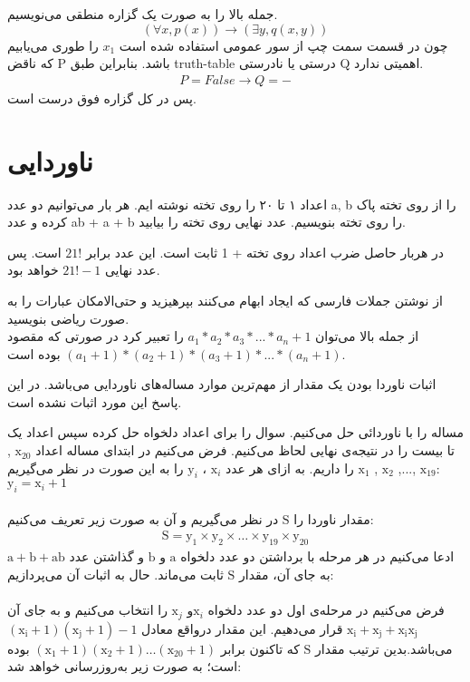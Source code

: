 \documentclass[11pt,largemargins]{h2wp}
\begin{document}
 جمله بالا را به صورت یک گزاره منطقی می‌نویسیم.
  $$  (\forall x,p(x)) \rightarrow (\exists y, q(x,y)) $$
چون در قسمت سمت چپ از سور عمومی استفاده شده است 
$ x_1 $
را طوری می‌یابیم که ناقض P باشد. بنابراین طبق truth-table درستی یا نادرستی Q اهمیتی ندارد.
\begin{align*}
 P=False \rightarrow Q= -
\end{align*}
پس در کل گزاره فوق درست است.

 
 \chapter*{ناوردایی}
 
 \question
 اعداد ۱ تا ۲۰ را روی تخته نوشته ایم. هر بار می‌توانیم دو عدد a, b را از روی تخته پاک کرده و عدد ab + a + b را روی تخته بنویسیم. عدد نهایی روی تخته را بیابید.
 
 
 \solution
 در هربار حاصل ضرب اعداد روی تخته + 1 ثابت است. این عدد برابر  $ 21!$  است. پس عدد نهایی $21! - 1 $  خواهد بود.
 
 
 
 \notes
 
 
  \Nnote 
 از نوشتن جملات فارسی که ایجاد ابهام می‌کنند بپرهیزید و حتی‌الامکان عبارات را به صورت ریاضی بنویسید.\\
 از جمله بالا می‌توان 
 $ a_1 * a_2 * a_3 * ... * a_n + 1 $
 را تعبیر کرد در صورتی که مقصود 
 $ (a_1 + 1) * (a_2 + 1) * (a_3 + 1 ) * ... * (a_n + 1) $
 بوده است.
 
\Tnote
 اثبات ناوردا بودن یک مقدار از مهم‌ترین موارد مساله‌ها‌ی ناوردایی می‌باشد. در این پاسخ این مورد اثبات نشده است.
 
 
  مساله را با ناوردائی حل می‌کنیم. سوال را برای اعداد دلخواه حل کرده سپس اعداد یک تا بیست را در نتیجه‌ی نهایی لحاظ می‌کنیم. فرض می‌کنیم در ابتدای مساله اعداد 
    $\mathrm{x}_{20}$
    ,
    $\mathrm{x}_{19}$
    ,...,
    $\mathrm{x}_2$
    ,
    $\mathrm{x}_1$
    را داریم. به ازای هر عدد
    $\mathrm{x}_{i}$
    ،
    $\mathrm{y}_{i}$
    را به این صورت در نظر می‌گیریم:      
    $\mathrm{y}_{i} = \mathrm{x}_{i} + 1$\\
    \\
    مقدار ناوردا را
    $\mathrm{S}$
    در نظر می‌گیریم و آن به صورت زیر تعریف می‌کنیم:
    \begin{align} \nonumber
        \mathrm{S} = \mathrm{y}_{1} \times \mathrm{y}_{2} \times \ldots \times \mathrm{y}_{19} \times \mathrm{y}_{20} \nonumber
    \end{align}
    ادعا می‌کنیم در هر مرحله با برداشتن دو عدد دلخواه
    $ \mathrm{a}$
    و
    $ \mathrm{b}$
    و گذاشتن عدد
    $\mathrm{a + b + ab}$
    به جای آن، مقدار
    $\mathrm{S}$
    ثابت می‌ماند. حال به اثبات آن می‌پردازیم:\\
    \\
    فرض می‌کنیم در مرحله‌‌ی اول دو عدد دلخواه
    $\mathrm{x}_{i}$و $\mathrm{x}_{j}$
    را انتخاب می‌کنیم و به جای آن
    $\mathrm{{x}_{i}+{x}_{j}+ {x}_{i}{x}_{j}}$
    قرار می‌دهیم. این مقدار درواقع معادل
    $\mathrm{({x}_{i} + 1)({x}_{j} + 1) - 1}$
    می‌باشد.بدین ترتیب مقدار
    $\mathrm{S}$
    که تاکنون برابر
    $\mathrm{({x}_1 + 1)({x}_2 + 1)\ldots({x}_{20} + 1)}$
    بوده است؛ به صورت زیر به‌روزرسانی خواهد شد:
    
\end{document}
